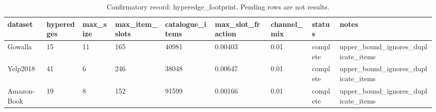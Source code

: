 \begin{table}[t]
\centering
\caption{Confirmatory record: hyperedge\_footprint. Pending rows are not results.}
\begin{tabular}{lllllllll}
\toprule
\textbf{dataset} & \textbf{hyperedges} & \textbf{max\_size} & \textbf{max\_item\_slots} & \textbf{catalogue\_items} & \textbf{max\_slot\_fraction} & \textbf{channel\_mix} & \textbf{status} & \textbf{notes} \\
\midrule
Gowalla & 15 & 11 & 165 & 40981 & 0.00403 & 0.01 & complete & upper\_bound\_ignores\_duplicate\_items \\
Yelp2018 & 41 & 6 & 246 & 38048 & 0.00647 & 0.01 & complete & upper\_bound\_ignores\_duplicate\_items \\
Amazon-Book & 19 & 8 & 152 & 91599 & 0.00166 & 0.01 & complete & upper\_bound\_ignores\_duplicate\_items \\
\bottomrule
\end{tabular}
\end{table}

